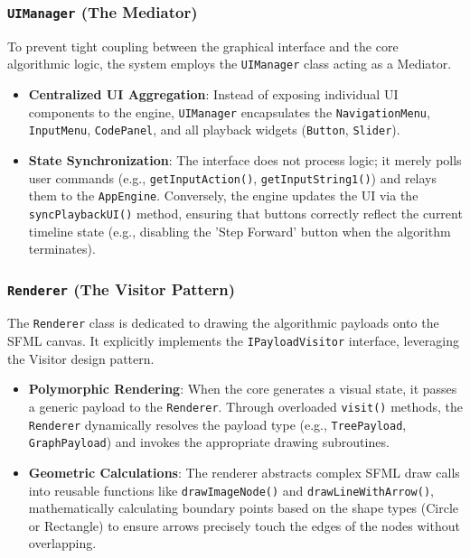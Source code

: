 \subsubsection{\texttt{UIManager} (The Mediator)}
To prevent tight coupling between the graphical interface and the core algorithmic logic, the system employs the \texttt{UIManager} class acting as a Mediator.
\begin{itemize}
    \item \textbf{Centralized UI Aggregation}: Instead of exposing individual UI components to the engine, \texttt{UIManager} encapsulates the \texttt{NavigationMenu}, \texttt{InputMenu}, \texttt{CodePanel}, and all playback widgets (\texttt{Button}, \texttt{Slider}).
    \item \textbf{State Synchronization}: The interface does not process logic; it merely polls user commands (e.g., \texttt{getInputAction()}, \texttt{getInputString1()}) and relays them to the \texttt{AppEngine}. Conversely, the engine updates the UI via the \texttt{syncPlaybackUI()} method, ensuring that buttons correctly reflect the current timeline state (e.g., disabling the 'Step Forward' button when the algorithm terminates).
\end{itemize}

\subsubsection{\texttt{Renderer} (The Visitor Pattern)}
The \texttt{Renderer} class is dedicated to drawing the algorithmic payloads onto the SFML canvas. It explicitly implements the \texttt{IPayloadVisitor} interface, leveraging the Visitor design pattern.
\begin{itemize}
    \item \textbf{Polymorphic Rendering}: When the core generates a visual state, it passes a generic payload to the \texttt{Renderer}. Through overloaded \texttt{visit()} methods, the \texttt{Renderer} dynamically resolves the payload type (e.g., \texttt{TreePayload}, \texttt{GraphPayload}) and invokes the appropriate drawing subroutines.
    \item \textbf{Geometric Calculations}: The renderer abstracts complex SFML draw calls into reusable functions like \texttt{drawImageNode()} and \texttt{drawLineWithArrow()}, mathematically calculating boundary points based on the shape types (Circle or Rectangle) to ensure arrows precisely touch the edges of the nodes without overlapping.
\end{itemize}

